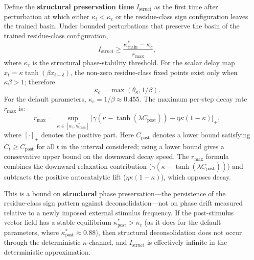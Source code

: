 \begin{theorem}\label{thm:reset}
Define the \textbf{structural preservation time} $I_{\mathrm{struct}}$ as the first time after perturbation at which either $\kappa_t < \kappa_c$ or the residue-class sign configuration leaves the trained basin. Under bounded perturbations that preserve the basin of the trained residue-class configuration,
\begin{equation}\label{eq:lowerbound}
I_{\mathrm{struct}} \geq \frac{\kappa^*_{\mathrm{train}} - \kappa_c}{r_{\max}},
\end{equation}
where $\kappa_c$ is the structural phase-stability threshold. For the scalar delay map $x_t = \kappa\tanh(\beta x_{t-\delta})$, the non-zero residue-class fixed points exist only when $\kappa\beta > 1$; therefore
\begin{equation}\label{eq:kappac}
\kappa_c = \max(\theta_\kappa, 1/\beta).
\end{equation}
For the default parameters, $\kappa_c = 1/\beta \approx 0.455$. The maximum per-step decay rate $r_{\max}$ is:
\begin{equation}\label{eq:rmax}
r_{\max} = \sup_{\kappa \in [\kappa_c, \kappa^*_{\mathrm{train}}]} \big[\gamma(\kappa - \tanh(\lambda C_{\mathrm{post}})) - \eta\kappa(1-\kappa)\big]_+,
\end{equation}
where $[\cdot]_+$ denotes the positive part. Here $C_{\mathrm{post}}$ denotes a lower bound satisfying $C_t \geq C_{\mathrm{post}}$ for all $t$ in the interval considered; using a lower bound gives a conservative upper bound on the downward decay speed. The $r_{\max}$ formula combines the downward relaxation contribution ($\gamma(\kappa - \tanh(\lambda C_{\mathrm{post}}))$) and subtracts the positive autocatalytic lift ($\eta\kappa(1-\kappa)$), which opposes decay.

This is a bound on \textbf{structural} phase preservation---the persistence of the residue-class sign pattern against deconsolidation---not on phase drift measured relative to a newly imposed external stimulus frequency. If the post-stimulus vector field has a stable equilibrium $\kappa^*_{\mathrm{post}} > \kappa_c$ (as it does for the default parameters, where $\kappa^*_{\mathrm{post}} \approx 0.88$), then structural deconsolidation does not occur through the deterministic $\kappa$-channel, and $I_{\mathrm{struct}}$ is effectively infinite in the deterministic approximation.
\end{theorem}

